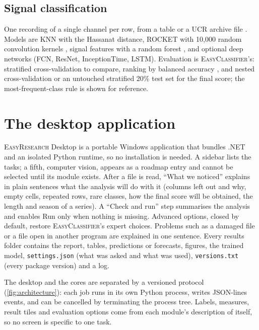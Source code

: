 \documentclass[11pt,a4paper]{article}
\newcommand{\ER}{\textsc{EasyResearch}}
\newcommand{\EC}{\textsc{EasyClassifier}}
\begin{document}
\subsection{Signal classification}
One recording of a single channel per row, from a table or a UCR archive file \citep{dau2019ucr}. Models are KNN with the Hassanat distance, ROCKET with 10{,}000 random convolution kernels \citep{dempster2020rocket}, signal features with a random forest \citep{fulcher2014features}, and optional deep networks (FCN, ResNet, InceptionTime, LSTM). Evaluation is \EC's: stratified cross-validation to compare, ranking by balanced accuracy \citep{brodersen2010balanced}, and nested cross-validation or an untouched stratified 20\% test set for the final score; the most-frequent-class rule is shown for reference.

\section{The desktop application}
\label{sec:desktop}

\ER{} Desktop is a portable Windows application that bundles .NET and an isolated Python runtime, so no installation is needed. A sidebar lists the tasks; a fifth, computer vision, appears as a roadmap entry and cannot be selected until its module exists. After a file is read, ``What we noticed'' explains in plain sentences what the analysis will do with it (columns left out and why, empty cells, repeated rows, rare classes, how the final score will be obtained, the length and season of a series). A ``Check and run'' step summarises the analysis and enables Run only when nothing is missing. Advanced options, closed by default, restore \EC's expert choices. Problems such as a damaged file or a file open in another program are explained in one sentence. Every results folder contains the report, tables, predictions or forecasts, figures, the trained model, \texttt{settings.json} (what was asked and what was used), \texttt{versions.txt} (every package version) and a log.

The desktop and the cores are separated by a versioned protocol (\cref{fig:architecture}): each job runs in its own Python process, writes JSON-lines events, and can be cancelled by terminating the process tree. Labels, measures, result tiles and evaluation options come from each module's description of itself, so no screen is specific to one task.

\end{document}
